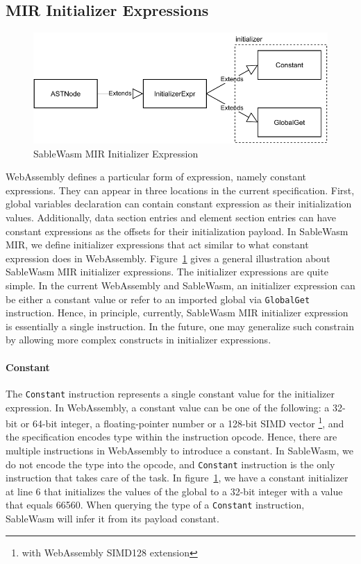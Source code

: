 \subsection{MIR Initializer Expressions}

\begin{figure}
  \centering
  \includegraphics[width=\textwidth]{Images/4.MIR/initializer-expression.pdf}
  \caption{SableWasm MIR Initializer Expression}
  \label{fig:sablewasm-mir-initializer-expression}
\end{figure}

WebAssembly defines a particular form of expression, namely constant expressions. They can appear in three locations in the current specification. First, global variables declaration can contain constant expression as their initialization values. Additionally, data section entries and element section entries can have constant expressions as the offsets for their initialization payload. In SableWasm MIR, we define initializer expressions that act similar to what constant expression does in WebAssembly. Figure~\ref{fig:sablewasm-mir-initializer-expression} gives a general illustration about SableWasm MIR initializer expressions. The initializer expressions are quite simple. In the current WebAssembly and SableWasm, an initializer expression can be either a constant value or refer to an imported global via \texttt{GlobalGet} instruction. Hence, in principle, currently, SableWasm MIR initializer expression is essentially a single instruction. In the future, one may generalize such constrain by allowing more complex constructs in initializer expressions. 

\paragraph{Constant}
The \texttt{Constant} instruction represents a single constant value for the initializer expression. In WebAssembly, a constant value can be one of the following: a 32-bit or 64-bit integer, a floating-pointer number or a 128-bit SIMD vector \footnote{with WebAssembly SIMD128 extension}, and the specification encodes type within the instruction opcode. Hence, there are multiple instructions in WebAssembly to introduce a constant. In SableWasm, we do not encode the type into the opcode, and \texttt{Constant} instruction is the only instruction that takes care of the task. In figure~\ref{fig:sablewasm-mir-initializer-expression}, we have a constant initializer at line 6 that initializes the values of the global to a 32-bit integer with a value that equals 66560. When querying the type of a \texttt{Constant} instruction, SableWasm will infer it from its payload constant.

